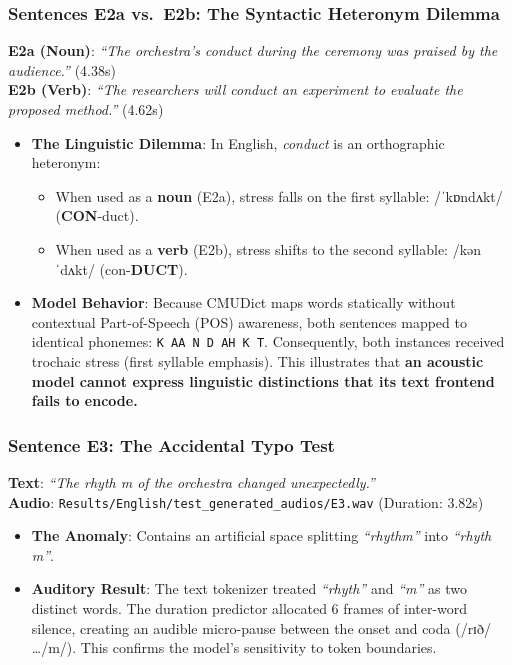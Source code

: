 \documentclass[11pt,a4paper]{article}
\begin{document}
\subsubsection{Sentences E2a vs.\ E2b: The Syntactic Heteronym Dilemma}
\textbf{E2a (Noun)}: \textit{``The orchestra's conduct during the ceremony was praised by the audience.''} (4.38s) \\
\textbf{E2b (Verb)}: \textit{``The researchers will conduct an experiment to evaluate the proposed method.''} (4.62s)
\begin{itemize}
  \item \textbf{The Linguistic Dilemma}: In English, \textit{conduct} is an orthographic heteronym:
  \begin{itemize}
    \item When used as a \textbf{noun} (E2a), stress falls on the first syllable: /ˈkɒndʌkt/ (\textbf{CON}-duct).
    \item When used as a \textbf{verb} (E2b), stress shifts to the second syllable: /kənˈdʌkt/ (con-\textbf{DUCT}).
  \end{itemize}
  \item \textbf{Model Behavior}: Because CMUDict maps words statically without contextual Part-of-Speech (POS) awareness, both sentences mapped to identical phonemes: \texttt{K AA N D AH K T}. Consequently, both instances received trochaic stress (first syllable emphasis). This illustrates that \textbf{an acoustic model cannot express linguistic distinctions that its text frontend fails to encode.}
\end{itemize}

\subsubsection{Sentence E3: The Accidental Typo Test}
\textbf{Text}: \textit{``The rhyth m of the orchestra changed unexpectedly.''} \\
\textbf{Audio}: \texttt{Results/English/test\_generated\_audios/E3.wav} (Duration: 3.82s)
\begin{itemize}
  \item \textbf{The Anomaly}: Contains an artificial space splitting \textit{``rhythm''} into \textit{``rhyth m''}.
  \item \textbf{Auditory Result}: The text tokenizer treated \textit{``rhyth''} and \textit{``m''} as two distinct words. The duration predictor allocated 6 frames of inter-word silence, creating an audible micro-pause between the onset and coda (/rɪð/ \dots /m/). This confirms the model's sensitivity to token boundaries.
\end{itemize}
\end{document}
